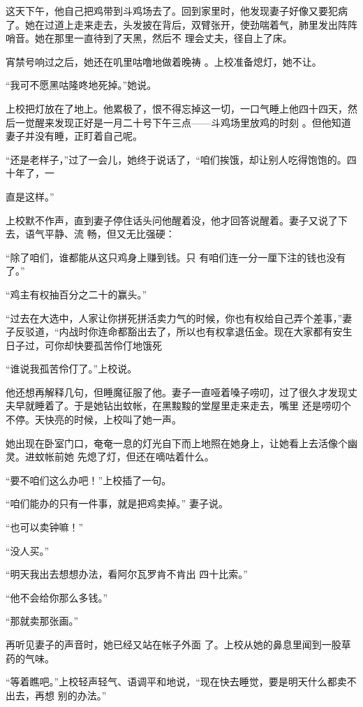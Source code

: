 \documentclass{article}
\begin{document}
这天下午，他自己把鸡带到斗鸡场去了。回到家里时，他发现妻子好像又要犯病了。她在过道上走来走去，头发披在背后，双臂张开，使劲喘着气，肺里发出阵阵哨音。她在那里一直待到了天黑，然后不
理会丈夫，径自上了床。 

宵禁号响过之后，她还在叽里咕噜地做着晚祷
。上校准备熄灯，她不让。 


“我可不愿黑咕隆咚地死掉。”她说。 

上校把灯放在了地上。他累极了，恨不得忘掉这一切，一口气睡上他四十四天，然后一觉醒来发现正好是一月二十号下午三点——斗鸡场里放鸡的时刻
。但他知道妻子并没有睡，正盯着自己呢。 

“还是老样子，”过了一会儿，她终于说话了，“咱们挨饿，却让别人吃得饱饱的。四十年了，一
\newpage

直是这样。” 

上校默不作声，直到妻子停住话头问他醒着没，他才回答说醒着。妻子又说了下去，语气平静、流
畅，但又无比强硬： 

“除了咱们，谁都能从这只鸡身上赚到钱。只
有咱们连一分一厘下注的钱也没有了。” 


“鸡主有权抽百分之二十的赢头。” 

“过去在大选中，人家让你拼死拼活卖力气的时候，你也有权给自己弄个差事，”妻子反驳道，“内战时你连命都豁出去了，所以也有权拿退伍金。现在大家都有安生日子过，可你却快要孤苦伶仃地饿死


“谁说我孤苦伶仃了。”上校说。 

他还想再解释几句，但睡魔征服了他。妻子一直哑着嗓子唠叨，过了很久才发现丈夫早就睡着了。于是她钻出蚊帐，在黑黢黢的堂屋里走来走去，嘴里
\newpage
还是唠叨个不停。天快亮的时候，上校叫了她一声。

她出现在卧室门口，奄奄一息的灯光自下而上地照在她身上，让她看上去活像个幽灵。进蚊帐前她
先熄了灯，但还在嘀咕着什么。 


“要不咱们这么办吧！”上校插了一句。 

“咱们能办的只有一件事，就是把鸡卖掉。”
妻子说。 


“也可以卖钟嘛！” 


“没人买。” 

“明天我出去想想办法，看阿尔瓦罗肯不肯出
四十比索。” 


“他不会给你那么多钱。” 


\newpage

“那就卖那张画。” 

再听见妻子的声音时，她已经又站在帐子外面
了。上校从她的鼻息里闻到一股草药的气味。 


“等着瞧吧。”上校轻声轻气、语调平和地说，“现在快去睡觉，要是明天什么都卖不出去，再想
别的办法。” 
\end{document}
